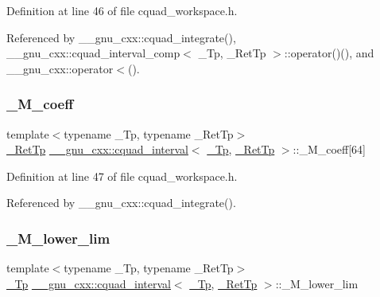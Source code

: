 Definition at line 46 of file cquad\+\_\+workspace.\+h.



Referenced by \+\_\+\+\_\+gnu\+\_\+cxx\+::cquad\+\_\+integrate(), \+\_\+\+\_\+gnu\+\_\+cxx\+::cquad\+\_\+interval\+\_\+comp$<$ \+\_\+\+Tp, \+\_\+\+Ret\+Tp $>$\+::operator()(), and \+\_\+\+\_\+gnu\+\_\+cxx\+::operator$<$().

\mbox{\label{struct____gnu__cxx_1_1cquad__interval_a852e4c25203cf39c21e0eeb16dd70bda}} 
\subsubsection{\texorpdfstring{\+\_\+\+M\+\_\+coeff}{\_M\_coeff}}
{\footnotesize\ttfamily template$<$typename \+\_\+\+Tp, typename \+\_\+\+Ret\+Tp$>$ \\
\hyperlink{namespace____gnu__cxx_a886e03ece3d53ff7fa6c098a40f93fa5}{\+\_\+\+Ret\+Tp} \hyperlink{struct____gnu__cxx_1_1cquad__interval}{\+\_\+\+\_\+gnu\+\_\+cxx\+::cquad\+\_\+interval}$<$ \hyperlink{namespace____gnu__cxx_a3b19a9c800ca194374ef9172290f7d79}{\+\_\+\+Tp}, \hyperlink{namespace____gnu__cxx_a886e03ece3d53ff7fa6c098a40f93fa5}{\+\_\+\+Ret\+Tp} $>$\+::\+\_\+\+M\+\_\+coeff\mbox{[}64\mbox{]}}



Definition at line 47 of file cquad\+\_\+workspace.\+h.



Referenced by \+\_\+\+\_\+gnu\+\_\+cxx\+::cquad\+\_\+integrate().

\mbox{\label{struct____gnu__cxx_1_1cquad__interval_a075cfcb47735ad5b69190a2246780475}} 
\subsubsection{\texorpdfstring{\+\_\+\+M\+\_\+lower\+\_\+lim}{\_M\_lower\_lim}}
{\footnotesize\ttfamily template$<$typename \+\_\+\+Tp, typename \+\_\+\+Ret\+Tp$>$ \\
\hyperlink{namespace____gnu__cxx_a3b19a9c800ca194374ef9172290f7d79}{\+\_\+\+Tp} \hyperlink{struct____gnu__cxx_1_1cquad__interval}{\+\_\+\+\_\+gnu\+\_\+cxx\+::cquad\+\_\+interval}$<$ \hyperlink{namespace____gnu__cxx_a3b19a9c800ca194374ef9172290f7d79}{\+\_\+\+Tp}, \hyperlink{namespace____gnu__cxx_a886e03ece3d53ff7fa6c098a40f93fa5}{\+\_\+\+Ret\+Tp} $>$\+::\+\_\+\+M\+\_\+lower\+\_\+lim}



